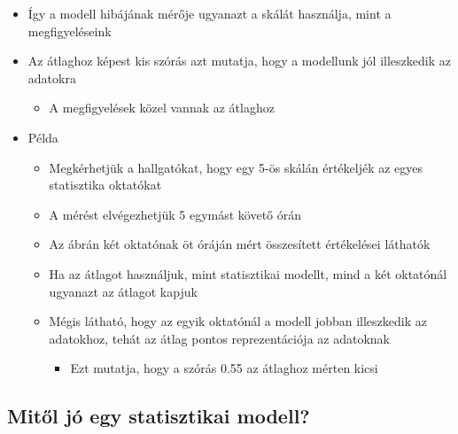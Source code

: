 \documentclass[
  letterpaper,
  DIV=11,
  numbers=noendperiod]{scrreprt}
\providecommand{\tightlist}{%
  \setlength{\itemsep}{0pt}\setlength{\parskip}{0pt}}\usepackage{longtable,booktabs,array}
\begin{document}
\begin{itemize}
\begin{itemize}
\begin{itemize}
      \begin{itemize}
      \item
        Így a modell hibájának mérője ugyanazt a skálát használja, mint
        a megfigyeléseink
      \item
        Az átlaghoz képest kis szórás azt mutatja, hogy a modellunk jól
        illeszkedik az adatokra

        \begin{itemize}
        \tightlist
        \item
          A megfigyelések közel vannak az átlaghoz
        \end{itemize}
      \item
        Példa

        \begin{itemize}
        \item
          Megkérhetjük a hallgatókat, hogy egy 5-ös skálán értékeljék az
          egyes statisztika oktatókat
        \item
          A mérést elvégezhetjük 5 egymást követő órán
        \item
          Az ábrán két oktatónak öt óráján mért összesített értékelései
          láthatók
        \item
          Ha az átlagot használjuk, mint statisztikai modellt, mind a
          két oktatónál ugyanazt az átlagot kapjuk
        \item
          Mégis látható, hogy az egyik oktatónál a modell jobban
          illeszkedik az adatokhoz, tehát az átlag pontos
          reprezentációja az adatoknak

          \begin{itemize}
          \tightlist
          \item
            Ezt mutatja, hogy a szórás 0.55 az átlaghoz mérten kicsi
          \end{itemize}
        \end{itemize}
      \end{itemize}
    \end{itemize}
  \end{itemize}
\end{itemize}

\hypertarget{mitux151l-juxf3-egy-statisztikai-modell}{%
\subsection{Mitől jó egy statisztikai
modell?}\label{mitux151l-juxf3-egy-statisztikai-modell}}
\end{document}
